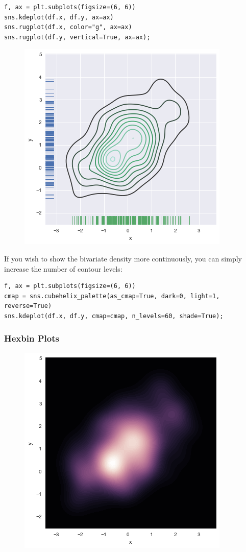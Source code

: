 \documentclass{beamer}
\begin{document}
\begin{frame}[fragile]
\begin{framed}
	\begin{verbatim}
f, ax = plt.subplots(figsize=(6, 6))
sns.kdeplot(df.x, df.y, ax=ax)
sns.rugplot(df.x, color="g", ax=ax)
sns.rugplot(df.y, vertical=True, ax=ax);
\end{verbatim}
\end{framed}
\begin{figure}
\centering
\includegraphics[width=0.55\linewidth]{images/distributions_36_0}
\end{figure}

\end{frame}
\begin{frame}[fragile]
	\large
If you wish to show the bivariate density more continuously, you can simply increase the number of contour levels:
\begin{verbatim}
f, ax = plt.subplots(figsize=(6, 6))
cmap = sns.cubehelix_palette(as_cmap=True, dark=0, light=1, reverse=True)
sns.kdeplot(df.x, df.y, cmap=cmap, n_levels=60, shade=True);
\end{verbatim}
\end{frame}
\begin{frame}[fragile]
\frametitle{Hexbin Plots}
	\large
\begin{figure}
\centering
\includegraphics[width=0.55\linewidth]{images/distributions_38_0}
\end{figure}


\end{frame}
\end{document}
